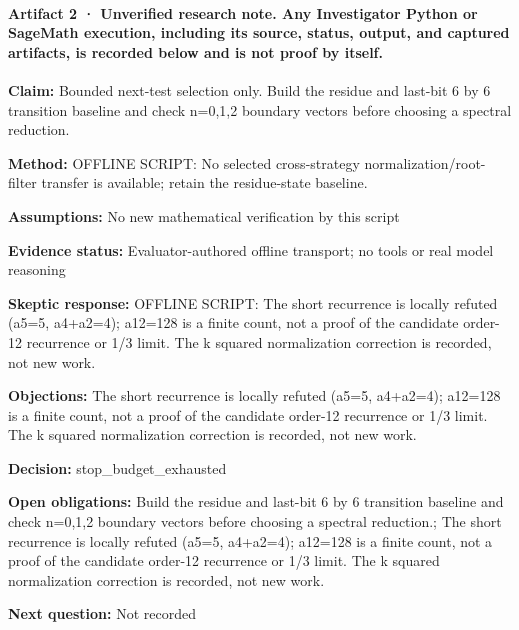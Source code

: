 \documentclass[11pt]{article}
\begin{document}
\paragraph{Artifact 2 · Unverified research note. Any Investigator Python or SageMath execution, including its source, status, output, and captured artifacts, is recorded below and is not proof by itself.}
\textbf{Claim:} Bounded next-test selection only. Build the residue and last-bit 6 by 6 transition baseline and check n=0,1,2 boundary vectors before choosing a spectral reduction.\par
\textbf{Method:} OFFLINE SCRIPT: No selected cross-strategy normalization/root-filter transfer is available; retain the residue-state baseline.\par
\textbf{Assumptions:} No new mathematical verification by this script\par
\textbf{Evidence status:} Evaluator-authored offline transport; no tools or real model reasoning\par
\textbf{Skeptic response:} OFFLINE SCRIPT: The short recurrence is locally refuted (a5=5, a4+a2=4); a12=128 is a finite count, not a proof of the candidate order-12 recurrence or 1/3 limit. The k squared normalization correction is recorded, not new work.\par
\textbf{Objections:} The short recurrence is locally refuted (a5=5, a4+a2=4); a12=128 is a finite count, not a proof of the candidate order-12 recurrence or 1/3 limit. The k squared normalization correction is recorded, not new work.\par
\textbf{Decision:} stop\_budget\_exhausted\par
\textbf{Open obligations:} Build the residue and last-bit 6 by 6 transition baseline and check n=0,1,2 boundary vectors before choosing a spectral reduction.; The short recurrence is locally refuted (a5=5, a4+a2=4); a12=128 is a finite count, not a proof of the candidate order-12 recurrence or 1/3 limit. The k squared normalization correction is recorded, not new work.\par
\textbf{Next question:} Not recorded\par
\end{document}
